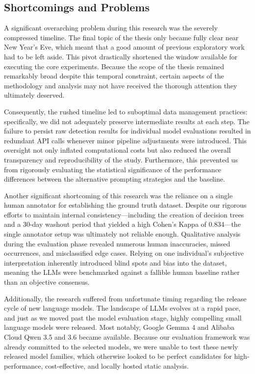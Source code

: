 \subsection{Shortcomings and Problems}

A significant overarching problem during this research was the severely compressed timeline. The final topic of the thesis only became fully clear near New Year's Eve, which meant that a good amount of previous exploratory work had to be left aside. This pivot drastically shortened the window available for executing the core experiments. Because the scope of the thesis remained remarkably broad despite this temporal constraint, certain aspects of the methodology and analysis may not have received the thorough attention they ultimately deserved.

Consequently, the rushed timeline led to suboptimal data management practices: specifically, we did not adequately preserve intermediate results at each step. The failure to persist raw detection results for individual model evaluations resulted in redundant API calls whenever minor pipeline adjustments were introduced. This oversight not only inflated computational costs but also reduced the overall transparency and reproducibility of the study. Furthermore, this prevented us from rigorously evaluating the statistical significance of the performance differences between the alternative prompting strategies and the baseline.

Another significant shortcoming of this research was the reliance on a single human annotator for establishing the ground truth dataset. Despite our rigorous efforts to maintain internal consistency—including the creation of decision trees and a 30-day washout period that yielded a high Cohen’s Kappa of \num{0.834}—the single annotator setup was ultimately not reliable enough. Qualitative analysis during the evaluation phase revealed numerous human inaccuracies, missed occurrences, and misclassified edge cases. Relying on one individual's subjective interpretation inherently introduced blind spots and bias into the dataset, meaning the LLMs were benchmarked against a fallible human baseline rather than an objective consensus.

Additionally, the research suffered from unfortunate timing regarding the release cycle of new language models. The landscape of LLMs evolves at a rapid pace, and just as we moved past the model evaluation stage, highly compelling small language models were released. Most notably, Google Gemma 4 and Alibaba Cloud Qwen 3.5 and 3.6 became available. Because our evaluation framework was already committed to the selected models, we were unable to test these newly released model families, which otherwise looked to be perfect candidates for high-performance, cost-effective, and locally hosted static analysis.


